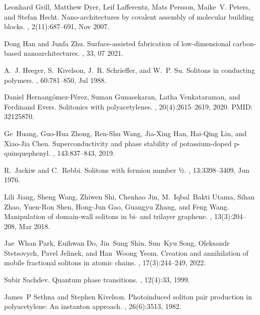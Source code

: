 \documentclass[10pt,a4paper]{article}
\begin{document}
\begin{thebibliography}{10}
Leonhard Grill, Matthew Dyer, Leif Lafferentz, Mats Persson, Maike~V. Peters,
  and Stefan Hecht.
\newblock Nano-architectures by covalent assembly of molecular building blocks.
, 2(11):687--691, Nov 2007.

Dong Han and Junfa Zhu.
\newblock Surface-assisted fabrication of low-dimensional carbon-based
  nanoarchitectures.
, 33, 07 2021.

A.~J. Heeger, S.~Kivelson, J.~R. Schrieffer, and W.~P. Su.
\newblock Solitons in conducting polymers.
, 60:781--850, Jul 1988.

Daniel Hernangómez-Pérez, Suman Gunasekaran, Latha Venkataraman, and
  Ferdinand Evers.
\newblock Solitonics with polyacetylenes.
, 20(4):2615--2619, 2020.
\newblock PMID: 32125870.

Ge~Huang, Guo-Hua Zhong, Ren-Shu Wang, Jia-Xing Han, Hai-Qing Lin, and Xiao-Jia
  Chen.
\newblock Superconductivity and phase stability of potassium-doped
  p-quinquephenyl.
, 143:837--843, 2019.

R.~Jackiw and C.~Rebbi.
\newblock Solitons with fermion number ½.
, 13:3398--3409, Jun 1976.

Lili Jiang, Sheng Wang, Zhiwen Shi, Chenhao Jin, M.~Iqbal~Bakti Utama, Sihan
  Zhao, Yuen-Ron Shen, Hong-Jun Gao, Guangyu Zhang, and Feng Wang.
\newblock Manipulation of domain-wall solitons in bi- and trilayer graphene.
, 13(3):204--208, Mar 2018.

Jae~Whan Park, Euihwan Do, Jin~Sung Shin, Sun~Kyu Song, Oleksandr Stetsovych,
  Pavel Jelinek, and Han~Woong Yeom.
\newblock Creation and annihilation of mobile fractional solitons in atomic
  chains.
, 17(3):244--249, 2022.

Subir Sachdev.
\newblock Quantum phase transitions.
, 12(4):33, 1999.

James~P Sethna and Stephen Kivelson.
\newblock Photoinduced soliton pair production in polyacetylene: An instanton
  approach.
, 26(6):3513, 1982.


\end{thebibliography}
\end{document}
